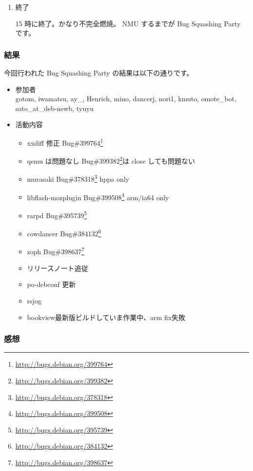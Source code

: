 \documentclass[mingoth,a4paper]{jsarticle}
\newcommand{\debianbug}[1]{Bug\##1\footnote{\url{http://bugs.debian.org/#1}}}
\begin{document}
\begin{enumerate}
\begin{itemize}
	\url{http://bugs.debian.org/release-critical/}
  \item 現在の RC バグ情報 
	
	\url{http://bugs.debian.org/release-critical/debian/all.html}
  \item リリースチームが使っている RC バグ管理サイト 
	
\url{http://bts.turmzimmer.net/details.php}
 \end{itemize}
\item 終了

 15 時に終了。かなり不完全燃焼。
 NMU するまでが Bug Squashing Party です。

\end{enumerate}

\subsubsection{結果}
 今回行われた Bug Squashing Party の結果は以下の通りです。

\begin{itemize}
 \item 参加者\\
 gotom,
 iwamatsu,
 ay\_,
 Henrich,
 mino,
 dancerj,
 nori1,
 kmuto,
 omote\_bot,
 sato\_at\_deb-newb,
 tyuyu

 \item 活動内容
   \begin{itemize}
   \item xxdiff 修正 \debianbug{399764}
   \item qemu は問題なし \debianbug{399382}は close しても問題ない
   \item murasaki \debianbug{378318} hppa only
   \item libflash-mozplugin \debianbug{399508} arm/ia64 only
   \item rarpd \debianbug{395739}
   \item cowdancer \debianbug{384132}
   \item zoph \debianbug{398637}
   \item リリースノート追従
   \item po-debconf 更新
   \item rsjog
   \item bookview最新版ビルドしていま作業中、arm fix失敗
   \end{itemize}
\end{itemize}

\subsubsection{感想}
\end{document}
